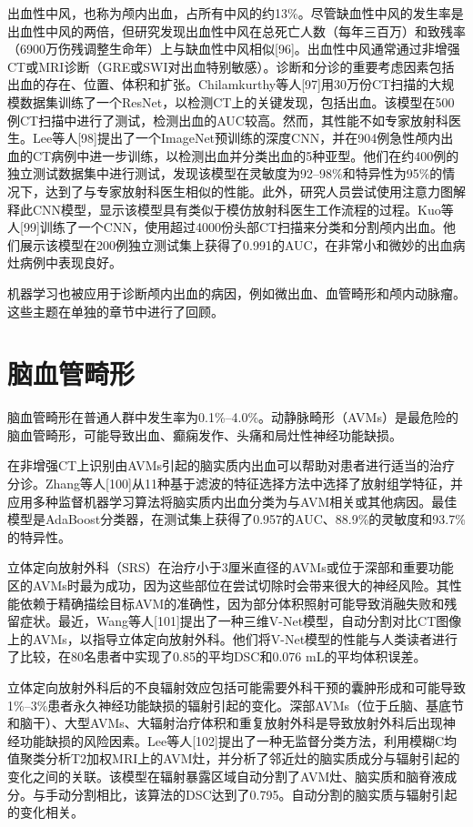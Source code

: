 \documentclass[11pt]{article}
\begin{document}
出血性中风，也称为颅内出血，占所有中风的约13\%。尽管缺血性中风的发生率是出血性中风的两倍，但研究发现出血性中风在总死亡人数（每年三百万）和致残率（6900万伤残调整生命年）上与缺血性中风相似[96]。出血性中风通常通过非增强CT或MRI诊断（GRE或SWI对出血特别敏感）。诊断和分诊的重要考虑因素包括出血的存在、位置、体积和扩张。Chilamkurthy等人[97]用30万份CT扫描的大规模数据集训练了一个ResNet，以检测CT上的关键发现，包括出血。该模型在500例CT扫描中进行了测试，检测出血的AUC较高。然而，其性能不如专家放射科医生。Lee等人[98]提出了一个ImageNet预训练的深度CNN，并在904例急性颅内出血的CT病例中进一步训练，以检测出血并分类出血的5种亚型。他们在约400例的独立测试数据集中进行测试，发现该模型在灵敏度为92–98\%和特异性为95\%的情况下，达到了与专家放射科医生相似的性能。此外，研究人员尝试使用注意力图解释此CNN模型，显示该模型具有类似于模仿放射科医生工作流程的过程。Kuo等人[99]训练了一个CNN，使用超过4000份头部CT扫描来分类和分割颅内出血。他们展示该模型在200例独立测试集上获得了0.991的AUC，在非常小和微妙的出血病灶病例中表现良好。

机器学习也被应用于诊断颅内出血的病因，例如微出血、血管畸形和颅内动脉瘤。这些主题在单独的章节中进行了回顾。

\section{\kaishu  脑血管畸形}

脑血管畸形在普通人群中发生率为0.1\%–4.0\%。动静脉畸形（AVMs）是最危险的脑血管畸形，可能导致出血、癫痫发作、头痛和局灶性神经功能缺损。

在非增强CT上识别由AVMs引起的脑实质内出血可以帮助对患者进行适当的治疗分诊。Zhang等人[100]从11种基于滤波的特征选择方法中选择了放射组学特征，并应用多种监督机器学习算法将脑实质内出血分类为与AVM相关或其他病因。最佳模型是AdaBoost分类器，在测试集上获得了0.957的AUC、88.9\%的灵敏度和93.7\%的特异性。

立体定向放射外科（SRS）在治疗小于3厘米直径的AVMs或位于深部和重要功能区的AVMs时最为成功，因为这些部位在尝试切除时会带来很大的神经风险。其性能依赖于精确描绘目标AVM的准确性，因为部分体积照射可能导致消融失败和残留症状。最近，Wang等人[101]提出了一种三维V-Net模型，自动分割对比CT图像上的AVMs，以指导立体定向放射外科。他们将V-Net模型的性能与人类读者进行了比较，在80名患者中实现了0.85的平均DSC和0.076 mL的平均体积误差。

立体定向放射外科后的不良辐射效应包括可能需要外科干预的囊肿形成和可能导致1\%–3\%患者永久神经功能缺损的辐射引起的变化。深部AVMs（位于丘脑、基底节和脑干）、大型AVMs、大辐射治疗体积和重复放射外科是导致放射外科后出现神经功能缺损的风险因素。Lee等人[102]提出了一种无监督分类方法，利用模糊C均值聚类分析T2加权MRI上的AVM灶，并分析了邻近灶的脑实质成分与辐射引起的变化之间的关联。该模型在辐射暴露区域自动分割了AVM灶、脑实质和脑脊液成分。与手动分割相比，该算法的DSC达到了0.795。自动分割的脑实质与辐射引起的变化相关。
\end{document}

